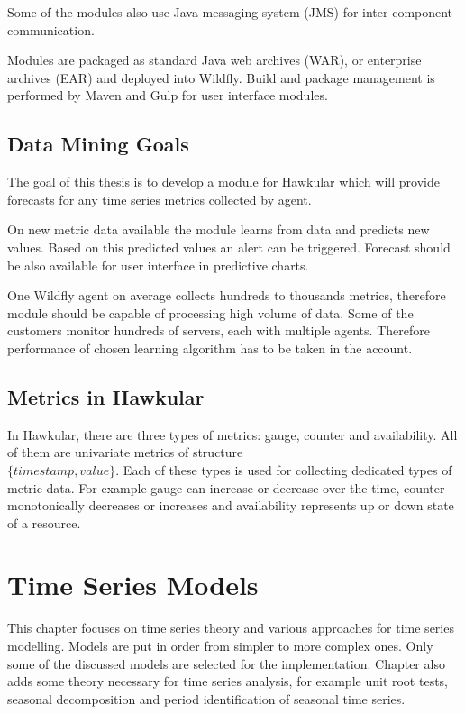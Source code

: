     Some of the modules also use Java messaging system (JMS) for inter-component communication.

    Modules are packaged as standard Java web archives (WAR), or enterprise archives (EAR) and deployed into Wildfly.
    Build and package management is performed by Maven and Gulp for user interface modules.

    \section{Data Mining Goals} \label{sec:goals}
    The goal of this thesis is to develop a module for Hawkular which will provide forecasts for any time series
    metrics collected by agent.

    On new metric data available the module learns from data and predicts new values. Based on this predicted values
    an alert can be triggered. Forecast should be also available for user interface in predictive charts.

    One Wildfly agent on average collects hundreds to thousands metrics, therefore module should be capable of
    processing high volume of data. Some of the customers monitor hundreds of servers, each with multiple agents.
    Therefore performance of chosen learning algorithm has to be taken in the account.

    \section{Metrics in Hawkular} \label{sec:metrics-in-hawkular}
    In Hawkular, there are three types of metrics: gauge, counter and availability. All of them are univariate metrics
    of structure \\$\{timestamp, value\}$. Each of these types is used for collecting dedicated types of metric data.
    For example gauge can increase or decrease over the time, counter monotonically decreases or increases and
    availability represents up or down state of a resource.

\chapter{Time Series Models} \label{chap:models}
This chapter focuses on time series theory and various approaches for time series modelling. Models are put in
order from simpler to more complex ones. Only some of the discussed models are selected for the implementation.
Chapter also adds some theory necessary for time series analysis, for example unit root tests,
seasonal decomposition and period identification of seasonal time series.

